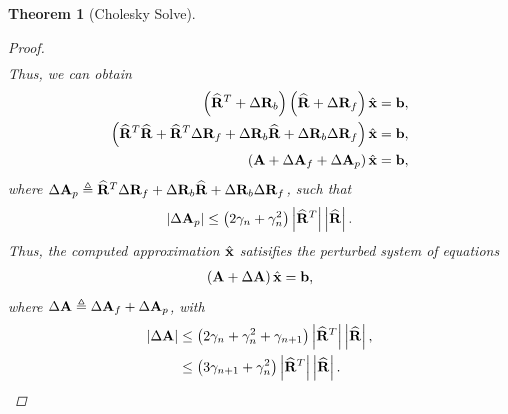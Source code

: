 \documentclass[11pt,draft]{article}
\newcommand{\define}{\ensuremath{\triangleq}}
\newcommand{\vect}[1]{\mathbf{\MakeLowercase{#1}}}
\newcommand{\mat}[1]{\mathbf{\MakeUppercase{#1}}}
\newtheorem{theorem}{Theorem}[section]
\theoremstyle{definition}
\theoremstyle{remark}
\newcommand{\abs}[1]{\left|#1\right|}
\begin{document}
\begin{theorem}[Cholesky Solve]
\begin{proof}
\begin{align}
    \end{align}
    Thus, we can obtain
    \begin{align}
        \left(\widehat{\mat{r}}^T + \Delta \mat{r}_b\right)\left(\widehat{\mat{r}} + \Delta \mat{r}_f\right)\hat{\vect{x}} = \vect{b},\\
        \left(\widehat{\mat{r}}^T\widehat{\mat{r}} + \widehat{\mat{r}}^T\Delta \mat{r}_f + \Delta \mat{r}_b\widehat{\mat{r}} + \Delta \mat{r}_b \Delta \mat{r}_f\right) \hat{\vect{x}} = \vect{b},\\
        \left(\mat{a} + \Delta \mat{a}_f + \Delta \mat{a}_p\right)\hat{\vect{x}} = \vect{b},
    \end{align}
    where $\Delta \mat{a}_p \define \widehat{\mat{r}}^T\Delta \mat{r}_f + \Delta \mat{r}_b\widehat{\mat{r}} + \Delta \mat{r}_b \Delta \mat{r}_f$, such that 
    \begin{align}
        \abs{\Delta \mat{a}_p} \leq \left(2\gamma_n + \gamma_n^2\right) \abs{\widehat{\mat{r}}^T}\abs{\widehat{\mat{r}}}.
    \end{align}
    Thus, the computed approximation $\hat{\vect{x}}$ satisifies the perturbed system of equations
    \begin{align}
    \left(\mat{a} + \Delta \mat{a}\right) \hat{\vect{x}} = \vect{b},
    \end{align}
    where $\Delta \mat{a} \define \Delta \mat{a}_f + \Delta \mat{a}_p$, with
    \begin{align}
       \abs{\Delta\mat{a}}  &\leq \left(2\gamma_n + \gamma_n^2 + \gamma_{n+1}\right) \abs{\widehat{\mat{r}}^T}\abs{\widehat{\mat{r}}},\\
       &\leq \left(3\gamma_{n+1} + \gamma_n^2 \right)\abs{\widehat{\mat{r}}^T}\abs{\widehat{\mat{r}}}.
    \end{align}

\end{proof}
\end{theorem}
\end{document}
